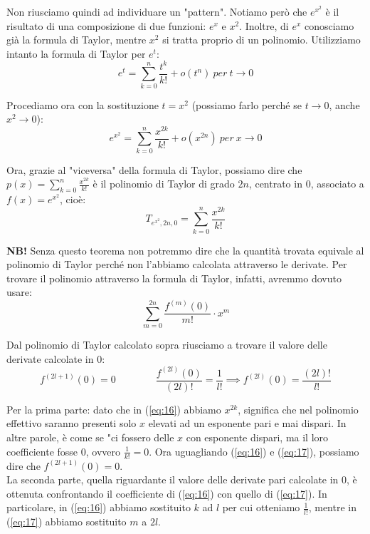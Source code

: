 \documentclass{article}
\begin{document}
\noindent Non riusciamo quindi ad individuare un "pattern". Notiamo però che $e^{x^2}$ è il risultato di una composizione di due funzioni: $e^x$ e $x^2$. Inoltre, di $e^x$ conosciamo già la formula di Taylor, mentre $x^2$ si tratta proprio di un polinomio. Utilizziamo intanto la formula di Taylor per $e^t$:
\begin{equation*}
    e^t = \sum_{k = 0}^n \frac{t^k}{k!} + o(t^n) \ per \ t \to 0
\end{equation*}

\noindent Procediamo ora con la sostituzione $t = x^2$ (possiamo farlo perché se $t \to 0$, anche $x^2 \to 0$):
\begin{equation*}
    e^{x^2} = \sum_{k = 0}^n \frac{x^{2k}}{k!} + o(x^{2n}) \ per \ x \to 0
\end{equation*}

\noindent Ora, grazie al "viceversa" della formula di Taylor, possiamo dire che $p(x) = \sum_{k = 0}^n \frac{x^{2k}}{k!}$ è il polinomio di Taylor di grado $2n$, centrato in $0$, associato a $f(x) = e^{x^2}$, cioè:
\begin{equation}
    T_{e^{x^2}, 2n, 0} = \sum_{k = 0}^n \frac{x^{2k}}{k!}
    \label{eq:16}
\end{equation}

\noindent\textbf{NB!} Senza questo teorema non potremmo dire che la quantità trovata equivale al polinomio di Taylor perché non l'abbiamo calcolata attraverso le derivate. Per trovare il polinomio attraverso la formula di Taylor, infatti, avremmo dovuto usare:
\begin{equation}
    \sum_{m = 0}^{2n} \frac{f^{(m)}(0)}{m!} \cdot x^m
    \label{eq:17}
\end{equation}

\noindent Dal polinomio di Taylor calcolato sopra riusciamo a trovare il valore delle derivate calcolate in $0$:
\begin{equation*}
    f^{(2l + 1)}(0) = 0 \qquad \qquad \frac{f^{(2l)}(0)}{(2l)!} = \frac{1}{l!} \implies f^{(2l)}(0) = \frac{(2l)!}{l!}
\end{equation*}

\noindent Per la prima parte: dato che in (\ref{eq:16}) abbiamo $x^{2k}$, significa che nel polinomio effettivo saranno presenti solo $x$ elevati ad un esponente pari e mai dispari. In altre parole, è come se "ci fossero delle $x$ con esponente dispari, ma il loro coefficiente fosse $0$, ovvero $\frac{1}{k!} = 0$. Ora uguagliando (\ref{eq:16}) e (\ref{eq:17}), possiamo dire che $f^{(2l + 1)}(0) = 0$. \\
La seconda parte, quella riguardante il valore delle derivate pari calcolate in $0$, è ottenuta confrontando il coefficiente di (\ref{eq:16}) con quello di (\ref{eq:17}). In particolare, in (\ref{eq:16}) abbiamo sostituito $k$ ad $l$ per cui otteniamo $\frac{1}{l!}$, mentre in (\ref{eq:17}) abbiamo sostituito $m$ a $2l$.
\end{document}
